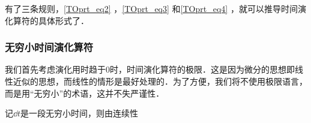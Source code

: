 有了三条规则，\autoref{TOprt_eq2} ，\autoref{TOprt_eq3} 和\autoref{TOprt_eq4} ，就可以推导时间演化算符的具体形式了．


\subsubsection{无穷小时间演化算符}

我们首先考虑演化用时趋于$0$时，时间演化算符的极限．这是因为微分的思想即线性近似的思想，而线性的情形是最好处理的．为了方便，我们将不使用极限语言，而是用“无穷小”的术语，这并不失严谨性．

记$\dd t$是一段无穷小时间，则由连续性





















